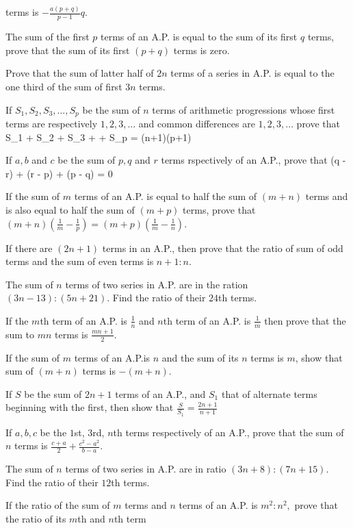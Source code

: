   terms is $-\frac{a(p + q)}{p - 1}q$.
\item The sum of the first $p$ terms of an A.P. is equal to the sum of its first $q$ terms, prove that the sum of its first $(p +
  q)$ terms is zero.
\item Prove that the sum of latter half of $2n$ terms of a series in A.P. is equal to the one third of the sum of first $3n$ terms.
\item If $S_1, S_2, S_3, \ldots, S_p$ be the sum of $n$ terms of arithmetic progressions whose first terms are respectively $1, 2,
  3, \ldots$ and common differences are $1, 2, 3, \ldots$ prove that \startformula S_1 + S_2 + S_3 + \cdots + S_p = (n+1)(p+1)\stopformula
\item If $a,b$ and $c$ be the sum of $p, q$ and $r$ terms rspectively of an A.P., prove that \startformula {}(q - r) + (r -
  p) + (p - q) = 0\stopformula
\item If the sum of $m$ terms of an A.P. is equal to half the sum of $(m + n)$ terms and is also equal to half the sum of $(m + p)$
  terms, prove that $(m + n)\left(\frac{1}{m} - \frac{1}{p}\right) = (m + p)\left(\frac{1}{m} - \frac{1}{n}\right)$.
\item If there are $(2n + 1)$ terms in an A.P., then prove that the ratio of sum of odd terms and the sum of even terms is $n + 1:
  n$.
\item The sum of $n$ terms of two series in A.P. are in the ration $(3n - 13): (5n + 21)$. Find the ratio of their $24$th terms.
\item If the $m$th term of an A.P. is $\frac{1}{n}$ and $n$th term of an A.P. is $\frac{1}{m}$ then prove that the sum to $mn$
  terms is $\frac{mn + 1}{2}$.
\item If the sum of $m$ terms of an A.P.is $n$ and the sum of its $n$ terms is $m$, show that sum of $(m + n)$ terms is $-(m + n)$.
\item If $S$ be the sum of $2n + 1$ terms of an A.P., and $S_1$ that of alternate terms beginning with the first, then show that
  $\frac{S}{S_1} = \frac{2n + 1}{n + 1}$
\item If $a, b, c$ be the $1$st, $3$rd, $n$th terms respectively of an A.P., prove that the sum of $n$ terms is $\frac{c + a}{2} +
  \frac{c^2 - a^2}{b - a}$.
\item The sum of $n$ terms of two series in A.P. are in ratio $(3n + 8):(7n + 15)$. Find the ratio of their $12$th terms.
\item If the ratio of the sum of $m$ terms and $n$ terms of an A.P. is $m^2:n^2,$ prove that the ratio of its $m$th and $n$th term
